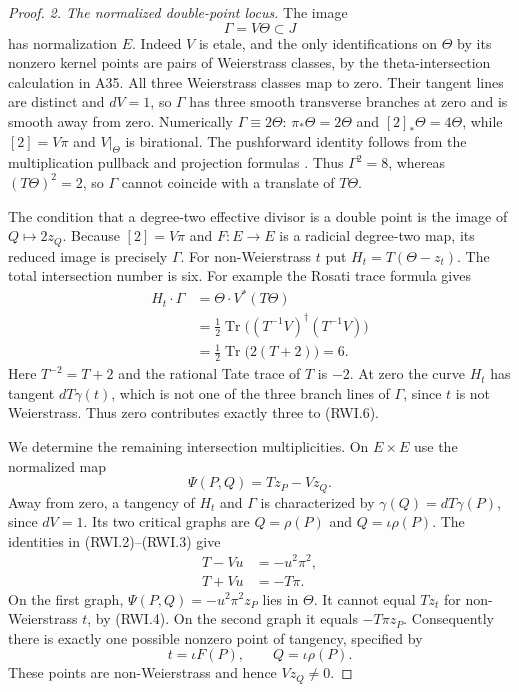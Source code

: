 \begin{proof}
\emph{2. The normalized double-point locus.}
The image
\[
                         \Gamma=V\Theta\subset J
 \tag{RWI.5}
\]
has normalization $E$. Indeed $V$ is etale, and the only
identifications on $\Theta$ by its nonzero kernel points
are pairs of Weierstrass classes, by the theta-intersection
calculation in A35. All three Weierstrass classes map to
zero. Their tangent lines are distinct and $dV=1$, so
$\Gamma$ has three smooth transverse branches at zero
and is smooth away from zero. Numerically $\Gamma\equiv2\Theta$:
$\pi_*\Theta=2\Theta$ and $[2]_*\Theta=4\Theta$, while
$[2]=V\pi$ and $V|_\Theta$ is birational. The pushforward
identity follows from the multiplication pullback and projection
formulas \cite[Corollary~6.6 and Lemma~8.3]{MilneAV}.
Thus $\Gamma^2=8$, whereas $(T\Theta)^2=2$, so $\Gamma$
cannot coincide with a translate of $T\Theta$.

The condition that a degree-two effective divisor is a
double point is the image of $Q\mapsto 2z_Q$.
Because $[2]=V\pi$ and $F:E\to E$ is a radicial degree-two
map, its reduced image is precisely $\Gamma$.
For non-Weierstrass $t$ put
$H_t=T(\Theta-z_t)$. The total intersection number is six.
For example the Rosati trace formula gives
\[
 \begin{aligned}
 H_t\cdot\Gamma
 &=\Theta\cdot V^*(T\Theta)\\
 &=\tfrac12\operatorname{Tr}
       \bigl((T^{-1}V)^\dagger(T^{-1}V)\bigr)\\
 &=\tfrac12\operatorname{Tr}\bigl(2(T+2)\bigr)=6.
 \end{aligned}
 \tag{RWI.6}
\]
Here $T^{-2}=T+2$ and the rational Tate trace of $T$ is
$-2$. At zero the curve $H_t$ has tangent
$dT\gamma(t)$, which is not one of the three branch
lines of $\Gamma$, since $t$ is not Weierstrass.
Thus zero contributes exactly three to (RWI.6).

We determine the remaining intersection multiplicities.
On $E\times E$ use the normalized map
\[
                    \Psi(P,Q)=Tz_P-Vz_Q.
 \tag{RWI.7}
\]
Away from zero, a tangency of $H_t$ and $\Gamma$ is
characterized by $\gamma(Q)=dT\gamma(P)$, since
$dV=1$. Its two critical graphs are
$Q=\rho(P)$ and $Q=\iota\rho(P)$.
The identities in (RWI.2)--(RWI.3) give
\[
 \begin{aligned}
 T-Vu&=-u^2\pi^2,\\
 T+Vu&=-T\pi.
 \end{aligned}
 \tag{RWI.8}
\]
On the first graph, $\Psi(P,Q)=-u^2\pi^2z_P$ lies in
$\Theta$. It cannot equal $Tz_t$ for non-Weierstrass $t$,
by (RWI.4). On the second graph it equals $-T\pi z_P$.
Consequently there is exactly one possible nonzero
point of tangency, specified by
\[
                   t=\iota F(P),\qquad Q=\iota\rho(P).
 \tag{RWI.9}
\]
These points are non-Weierstrass and hence $Vz_Q\ne0$.


\end{proof}
